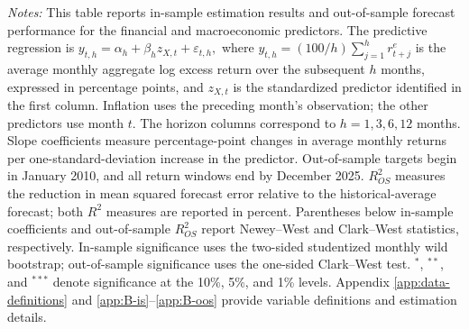 \begin{table}[H]
\begin{minipage}[t]{\linewidth}
\setlength{\abovedisplayshortskip}{2pt}\setlength{\belowdisplayshortskip}{2pt}
\textit{Notes:} This table reports in-sample estimation results and out-of-sample forecast performance for the financial and macroeconomic predictors. The predictive regression is
$y_{t,h}=\alpha_h+\beta_h z_{X,t}+\varepsilon_{t,h},$
where $y_{t,h}=(100/h)\sum_{j=1}^{h}r^e_{t+j}$ is the average monthly aggregate log excess return over the subsequent $h$ months, expressed in percentage points, and $z_{X,t}$ is the standardized predictor identified in the first column. Inflation uses the preceding month's observation; the other predictors use month $t$. The horizon columns correspond to $h=1,3,6,12$ months. Slope coefficients measure percentage-point changes in average monthly returns per one-standard-deviation increase in the predictor. Out-of-sample targets begin in January 2010, and all return windows end by December 2025. $R^2_{OS}$ measures the reduction in mean squared forecast error relative to the historical-average forecast; both $R^2$ measures are reported in percent. Parentheses below in-sample coefficients and out-of-sample $R^2_{OS}$ report Newey--West and Clark--West statistics, respectively. In-sample significance uses the two-sided studentized monthly wild bootstrap; out-of-sample significance uses the one-sided Clark--West test. $^{*}$, $^{**}$, and $^{***}$ denote significance at the 10\%, 5\%, and 1\% levels. Appendix \ref{app:data-definitions} and \ref{app:B-is}--\ref{app:B-oos} provide variable definitions and estimation details.\par\end{minipage}
\end{table}
